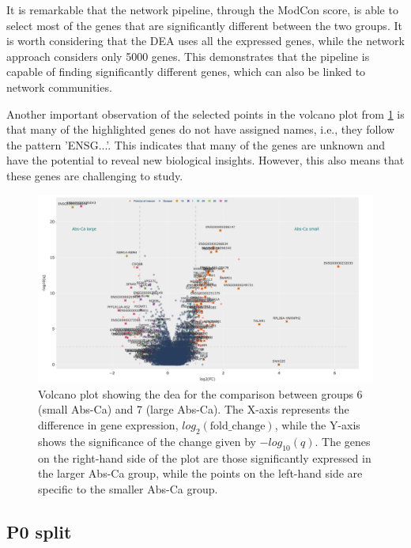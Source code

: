 It is remarkable that the network pipeline, through the ModCon score, is able to select most of the genes that are significantly different between the two groups. It is worth considering that the DEA uses all the expressed genes, while the network approach considers only 5000 genes. This demonstrates that the pipeline is capable of finding significantly different genes, which can also be linked to network communities.

Another important observation of the selected points in the volcano plot from \cref{fig:N_II:diff_split} is that many of the highlighted genes do not have assigned names, i.e., they follow the pattern 'ENSG...'. This indicates that many of the genes are unknown and have the potential to reveal new biological insights. However, this also means that these genes are challenging to study.

\begin{figure}[H]    
    \centering
    \includegraphics[width=1.0\textwidth,height=1.0\textheight,keepaspectratio]{Sections/Network_II/resources/non_tum/diff_split_dea.png}
    \caption{Volcano plot showing the \acrfull{dea} for the comparison between groups 6 (small Abs-Ca) and 7 (large Abs-Ca). The X-axis represents the difference in gene expression, $log_2(\text{fold\_change})$, while the Y-axis shows the significance of the change given by $-log_{10}(q)$. The genes on the right-hand side of the plot are those significantly expressed in the larger Abs-Ca group, while the points on the left-hand side are specific to the smaller Abs-Ca group.}
    \label{fig:N_II:diff_split}
\end{figure}



\subsection{P0 split} \label{s:N_II:p0_split}

